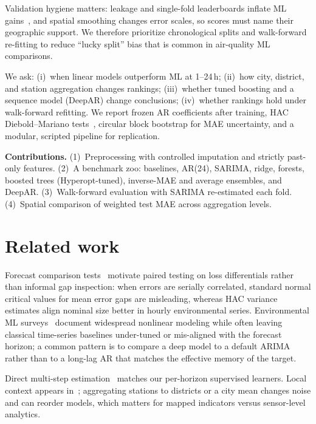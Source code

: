 \documentclass[conference]{IEEEtran}
\begin{document}
Validation hygiene matters: leakage and single-fold leaderboards inflate ML gains~\cite{hyndman2021forecasting}, and spatial smoothing changes error scales, so scores must name their geographic support. We therefore prioritize chronological splits and walk-forward re-fitting to reduce ``lucky split'' bias that is common in air-quality ML comparisons.

We ask: (i)~when linear models outperform ML at 1--24\,h; (ii)~how city, district, and station aggregation changes rankings; (iii)~whether tuned boosting and a sequence model (DeepAR) change conclusions; (iv)~whether rankings hold under walk-forward refitting. We report frozen AR coefficients after training, HAC Diebold--Mariano tests~\cite{diebold1995comparing,harvey1997testing}, circular block bootstrap for MAE uncertainty, and a modular, scripted pipeline for replication.

\textbf{Contributions.} (1)~Preprocessing with controlled imputation and strictly past-only features. (2)~A benchmark zoo: baselines, AR(24), SARIMA, ridge, forests, boosted trees (Hyperopt-tuned), inverse-MAE and average ensembles, and DeepAR. (3)~Walk-forward evaluation with SARIMA re-estimated each fold. (4)~Spatial comparison of weighted test MAE across aggregation levels.

\section{Related work}

Forecast comparison tests~\cite{diebold1995comparing,harvey1997testing} motivate paired testing on loss differentials rather than informal gap inspection: when errors are serially correlated, standard normal critical values for mean error gaps are misleading, whereas HAC variance estimates align nominal size better in hourly environmental series. Environmental ML surveys~\cite{shao2020predictions} document widespread nonlinear modeling while often leaving classical time-series baselines under-tuned or mis-aligned with the forecast horizon; a common pattern is to compare a deep model to a default ARIMA rather than to a long-lag AR that matches the effective memory of the target.

Direct multi-step estimation~\cite{marcellino2006comparison} matches our per-horizon supervised learners. Local context appears in~\cite{auaair2025yerevan}; aggregating stations to districts or a city mean changes noise and can reorder models, which matters for mapped indicators versus sensor-level analytics.
\end{document}
